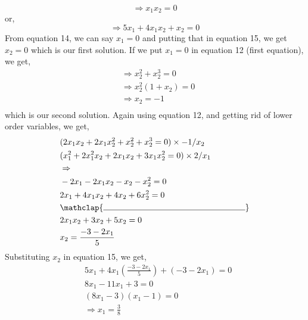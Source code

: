 \documentclass[a4paper,10pt]{article}
\begin{document}
\begin{enumerate}
\begin{equation}
\begin{split}
        \end{split}
    \end{equation}
    \begin{equation}
        \Rightarrow x_1x_2 = 0 
    \end{equation}
    or,
    \begin{equation}
        \Rightarrow 5x_1 + 4x_1x_2 + x_2 = 0 
    \end{equation}
    From equation 14, we can say $x_1 = 0$ and putting that in equation 15, we get $x_2 = 0$ which is our first solution. If we put $x_1 = 0$ in equation 12 (first equation), we get,
    \begin{equation}
        \begin{split}
            & \Rightarrow x_2^2 + x_2^3 = 0 \\ 
            & \Rightarrow x_2^2(1 + x_2) = 0 \\
            & \Rightarrow x_2 = -1 \\
        \end{split}
    \end{equation}
    which is our second solution. Again using equation 12, and getting rid of lower order variables, we get,
    \begin{equation}
        \begin{split}
           & (2x_1x_2 + 2x_1x_2^2 + x_2^2 + x_2^3 = 0) \times -1/x_2\\
          & (x_1^2 + 2x_1^2x_2 + 2x_1x_2 + 3x_1x_2^2 = 0) \times 2/x_1 \\
          & \Rightarrow \\
          & - 2x_1 - 2x_1x_2 - x_2 - x_2^2 = 0 \\
          & 2x_1 + 4x_1x_2 + 4x_2 + 6x_2^2 = 0 \\
          & \mathclap{\rule{6cm}{0.4pt}}\\
          & 2x_1x_2 + 3x_2 + 5x_2 = 0 \\ 
          & x_2 = \frac{-3-2x_1}{5}
        \end{split}
    \end{equation}
    Substituting $x_2$ in equation 15, we get,
    \begin{equation}
        \begin{split}
          & 5x_1 + 4x_1(\frac{-3-2x_1}{5}) + (-3-2x_1)  = 0 \\
          & 8x_1 - 11x_1 + 3 = 0  \\
          & (8x_1-3)(x_1-1)=0 \\
          & \Rightarrow x_1 = \frac{3}{8}  \\

\end{split}
\end{equation}
\end{enumerate}
\end{document}
